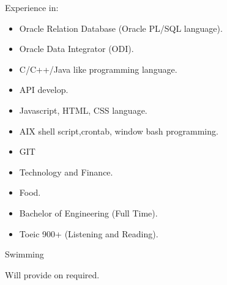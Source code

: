 Experience in:
\begin{itemize}
\item Oracle Relation Database (Oracle PL/SQL language).
\item Oracle Data Integrator (ODI).
\item C/C++/Java like programming language.
\item API develop.
\item Javascript, HTML, CSS language.
\item AIX shell script,crontab, window bash programming.
\item GIT
\end{itemize}
\begin{itemize}
\item Technology and Finance.
\item Food.
\end{itemize}

\begin{itemize}
\item Bachelor of Engineering (Full Time).
\item Toeic 900+ (Listening and Reading).
\end{itemize}








%
%
%
%
%
%
%
Swimming


Will provide on required.
%
%
%
